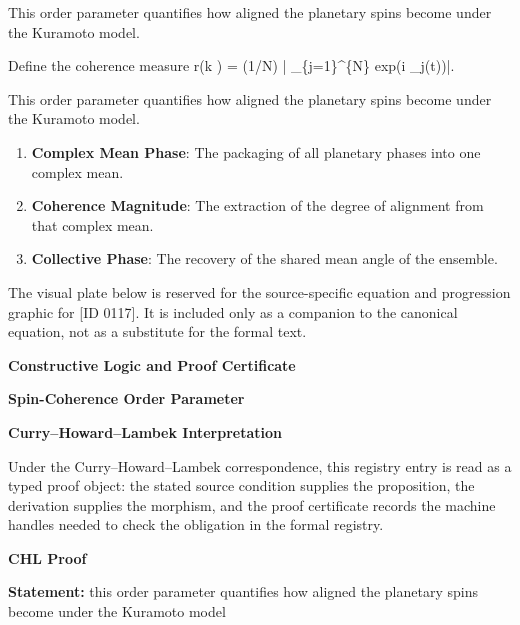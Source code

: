 This order parameter quantifies how aligned the planetary spins become under the Kuramoto model.

Define the coherence measure r(k ) = (1/N)   | \_\{j=1\}\textasciicircum{}\{N\} exp(i  \_j(t))|.

This order parameter quantifies how aligned the planetary spins become under the Kuramoto model.
\endgroup

\begin{enumerate}[leftmargin=1.6em,itemsep=6pt,topsep=4pt]
\item \textbf{Complex Mean Phase}: The packaging of all planetary phases into one complex mean.
\item \textbf{Coherence Magnitude}: The extraction of the degree of alignment from that complex mean.
\item \textbf{Collective Phase}: The recovery of the shared mean angle of the ensemble.
\end{enumerate}

\begingroup\footnotesize\sloppy
The visual plate below is reserved for the source-specific equation and progression graphic for [ID 0117]. It is included only as a companion to the canonical equation, not as a substitute for the formal text.
\par\endgroup
\ifTZPDarkEdition
{}
\fi

\clearpage
\begingroup\tzpsupportsetup
\noindent\textbf{\fontsize{10.8pt}{12.8pt}\selectfont [ID 0117] Constructive Logic and Proof Certificate}\par
\noindent\textbf{\fontsize{10pt}{12pt}\selectfont Spin-Coherence Order Parameter}\par
\vspace{0.45em}
\begingroup
\footnotesize
\setlength{\parskip}{0.22em}
\setlength{\parindent}{0pt}
\noindent\textbf{Curry--Howard--Lambek Interpretation}\par
Under the Curry--Howard--Lambek correspondence, this registry entry is read as a typed proof
object: the stated source condition supplies the proposition, the derivation supplies the
morphism, and the proof certificate records the machine handles needed to check the obligation
in the formal registry.

\vspace{0.45em}
\noindent\textbf{CHL Proof}\par
\textbf{Statement:} this order parameter quantifies how aligned the planetary spins become under the
Kuramoto model

